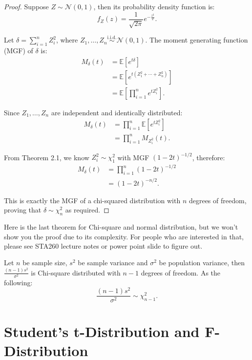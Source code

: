 \begin{proof}
Suppose $Z \sim \mathcal{N}(0,1)$, then its probability density function is:
\[ f_Z(z) = \frac{1}{\sqrt{2\pi}} e^{-\frac{z^2}{2}}. \]

Let $\delta = \sum_{i=1}^{n} Z_i^2$, where $Z_1, \ldots, Z_n \stackrel{\text{i.i.d.}}{\sim} \mathcal{N}(0,1)$. The moment generating function (MGF) of $\delta$ is:
\begin{align*}
M_{\delta}(t) &= \mathbb{E}\left[e^{t\delta}\right] \\
&= \mathbb{E}\left[e^{t(Z_1^2 + \cdots + Z_n^2)}\right] \\
&= \mathbb{E}\left[\prod_{i=1}^n e^{tZ_i^2}\right].
\end{align*}

Since $Z_1, \ldots, Z_n$ are independent and identically distributed:
\begin{align*}
M_{\delta}(t) &= \prod_{i=1}^n \mathbb{E}\left[e^{tZ_i^2}\right] \\
&= \prod_{i=1}^n M_{Z_i^2}(t).
\end{align*}

From Theorem 2.1, we know $Z_i^2 \sim \chi_1^2$ with MGF $(1-2t)^{-1/2}$, therefore:
\begin{align*}
M_{\delta}(t) &= \prod_{i=1}^n (1-2t)^{-1/2} \\
&= (1-2t)^{-n/2}.
\end{align*}

This is exactly the MGF of a chi-squared distribution with $n$ degrees of freedom, proving that $\delta \sim \chi_n^2$ as required.
\end{proof}

\noindent
Here is the last theorem for Chi-square and normal distribution, but we won't show you the proof due to its complexity. For people who are interested in that, please see STA260 lecture notes or power point slide to figure out.

\begin{thm}
Let $n$ be sample size, $s^2$ be sample variance and $\sigma^2$ be population variance, then $\frac{(n-1)s^2}{\sigma^2}$ is Chi-square distributed with $n - 1$ degrees of freedom. As the following: \[ \frac{(n-1)s^2}{\sigma^2} \sim \chi_{n-1}^{2}.\]
\end{thm}

\section{Student's t-Distribution and F-Distribution}

